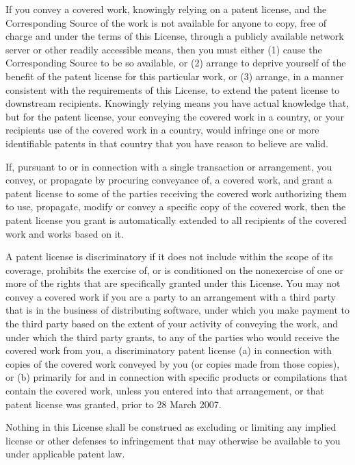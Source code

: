 \documentclass[letterpaper,10pt,english]{sphinxmanual}
\begin{document}
\begin{sphinxVerbatim}[commandchars=\\\{\}]
  If you convey a covered work, knowingly relying on a patent license,
and the Corresponding Source of the work is not available for anyone
to copy, free of charge and under the terms of this License, through a
publicly available network server or other readily accessible means,
then you must either (1) cause the Corresponding Source to be so
available, or (2) arrange to deprive yourself of the benefit of the
patent license for this particular work, or (3) arrange, in a manner
consistent with the requirements of this License, to extend the patent
license to downstream recipients.  \PYGZdq{}Knowingly relying\PYGZdq{} means you have
actual knowledge that, but for the patent license, your conveying the
covered work in a country, or your recipient\PYGZsq{}s use of the covered work
in a country, would infringe one or more identifiable patents in that
country that you have reason to believe are valid.

  If, pursuant to or in connection with a single transaction or
arrangement, you convey, or propagate by procuring conveyance of, a
covered work, and grant a patent license to some of the parties
receiving the covered work authorizing them to use, propagate, modify
or convey a specific copy of the covered work, then the patent license
you grant is automatically extended to all recipients of the covered
work and works based on it.

  A patent license is \PYGZdq{}discriminatory\PYGZdq{} if it does not include within
the scope of its coverage, prohibits the exercise of, or is
conditioned on the non\PYGZhy{}exercise of one or more of the rights that are
specifically granted under this License.  You may not convey a covered
work if you are a party to an arrangement with a third party that is
in the business of distributing software, under which you make payment
to the third party based on the extent of your activity of conveying
the work, and under which the third party grants, to any of the
parties who would receive the covered work from you, a discriminatory
patent license (a) in connection with copies of the covered work
conveyed by you (or copies made from those copies), or (b) primarily
for and in connection with specific products or compilations that
contain the covered work, unless you entered into that arrangement,
or that patent license was granted, prior to 28 March 2007.

  Nothing in this License shall be construed as excluding or limiting
any implied license or other defenses to infringement that may
otherwise be available to you under applicable patent law.


\end{sphinxVerbatim}
\end{document}
